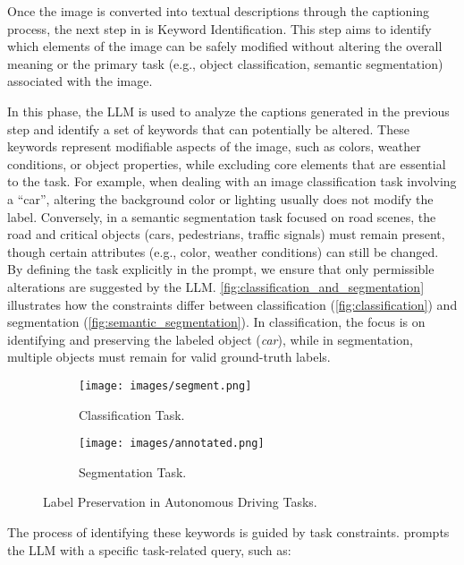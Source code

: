 Once the image is converted into textual descriptions through the captioning process, the next step in \approach is Keyword Identification. This step aims to identify which elements of the image can be safely modified without altering the overall meaning or the primary task (e.g., object classification, semantic segmentation) associated with the image. 

In this phase, the LLM is used to analyze the captions generated in the previous step and identify a set of keywords that can potentially be altered. These keywords represent modifiable aspects of the image, such as colors, weather conditions, or object properties, while excluding core elements that are essential to the task. For example, when dealing with an image classification task involving a ``car'', altering the background color or lighting usually does not modify the label. Conversely, in a semantic segmentation task focused on road scenes, the road and critical objects (cars, pedestrians, traffic signals) must remain present, though certain attributes (e.g., color, weather conditions) can still be changed. By defining the task explicitly in the prompt, we ensure that only permissible alterations are suggested by the LLM.
\autoref{fig:classification_and_segmentation} illustrates how the constraints differ between classification (\autoref{fig:classification}) and segmentation (\autoref{fig:semantic_segmentation}). In classification, the focus is on identifying and preserving the labeled object (\emph{car}), while in segmentation, multiple objects must remain for valid ground-truth labels.

\begin{figure}[]
\centering
    \begin{subfigure}{.49\linewidth}
    \centering
    \texttt{[image: images/segment.png]}
    \caption{Classification Task.}
    \label{fig:classification}
    \end{subfigure}
    \begin{subfigure}{.49\linewidth}
    \centering
    \texttt{[image: images/annotated.png]}
    \caption{Segmentation Task.}
    \label{fig:semantic_segmentation}
    \end{subfigure}
\caption{
Label Preservation in Autonomous Driving Tasks.
}
\label{fig:classification_and_segmentation}
\vspace{-6mm}
\end{figure}

The process of identifying these keywords is guided by task constraints. \approach prompts the LLM with a specific task-related query, such as:

